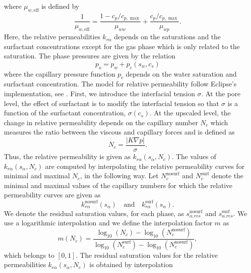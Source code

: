 \documentclass[11pt]{amsart}
\newcommand{\grad}{\nabla}
\newcommand{\eff}{\mathrm{eff}}
\newcommand{\cpmax}{c_{p,\max}}
\newcommand{\abs}[1]{\left| #1\right|}
\newcommand{\surf}{\text{surf}}
\newcommand{\nosurf}{\text{nosurf}}
\begin{document}
where $\mu_{w,\eff}$ is defined by
\begin{equation}
  \label{eq:defmuweff}
  \frac{1}{\mu_{w,\eff}}=\frac{1-c_p/\cpmax}{\mu_{ww}}+\frac{c_p/\cpmax}{\mu_{wp}}.
\end{equation}
Here, the relative permeabilities $k_{r\alpha}$ depends on the saturations and the surfactant concentrations except for the gas phase which is only related to the saturation. The phase pressures are given by the relation
\begin{equation}
  \label{eq:pressurerelationship}
  p_o = p_w + p_c(s_w, c_s) 
\end{equation}
where the capillary pressure function $p_c$ depends on the water saturation and surfactant concentration. The model for relative permeability follow Eclipse's implementation, see \cite{eclipse, Jorgensen}. First, we introduce the interfacial tension $\sigma$. At the pore level, the effect of surfactant is to modify the interfacial tension so that $\sigma$ is a function of the surfactant concentration, $\sigma(c_s)$. At the upscaled level, the change in relative permeability depends on the capillary number $N_c$ which measures the ratio between the viscous and capillary forces and is defined as
\begin{equation}
  \label{eq:defNc}
  N_c = \frac{\abs{K\grad p}}{\sigma}.
\end{equation}
Thus, the relative permeability is given as $k_{r\alpha}(s_\alpha, N_c)$. The values of $k_{r\alpha}(s_\alpha, N_c)$ are computed by interpolating the relative permeability curves for minimal and maximal $N_c$, in the following way. Let $N_c^{\nosurf}$ and $N_c^{\surf}$ denote the minimal and maximal values of the capillary numbers for which the relative permeability curves are given as
\begin{equation*}
  k_{r\alpha}^{\nosurf}(s_\alpha)\quad\text{and}\quad k_{r\alpha}^{\surf}(s_\alpha).
\end{equation*}
We denote the residual saturation values, for each phase, as $s_{\alpha. res}^{\nosurf}$ and $s_{\alpha. res}^{\surf}$. We use a logarithmic interpolation and we define the interpolation factor
$m$ as
\begin{equation} 
  \label{eq:defm}
  m(N_c) = \frac{\log_{10}(N_c) - \log_{10}(N_c^{\nosurf})}{\log_{10}(N_c^{\surf}) - \log_{10}(N_c^{\nosurf})},
\end{equation}
which belongs to $[0,1]$. The residual saturation values for the relative permeabilities $k_{r\alpha}(s_\alpha, N_c)$ is obtained by interpolation
\end{document}
